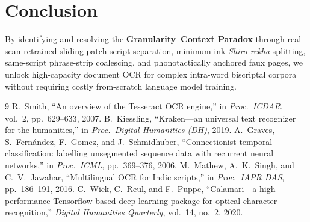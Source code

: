 \documentclass[10pt,twocolumn]{article}
\begin{document}
\section{Conclusion}

By identifying and resolving the \textbf{Granularity--Context Paradox} through real-scan-retrained sliding-patch script separation, minimum-ink \emph{Shiro-rekh\={a}} splitting, same-script phrase-strip coalescing, and phonotactically anchored faux pages, we unlock high-capacity document OCR for complex intra-word biscriptal corpora without requiring costly from-scratch language model training.

\begin{thebibliography}{9}
 R.~Smith, ``An overview of the Tesseract OCR engine,'' in \emph{Proc.\ ICDAR}, vol.~2, pp.~629--633, 2007.
 B.~Kiessling, ``Kraken---an universal text recognizer for the humanities,'' in \emph{Proc.\ Digital Humanities (DH)}, 2019.
 A.~Graves, S.~Fern\'{a}ndez, F.~Gomez, and J.~Schmidhuber, ``Connectionist temporal classification: labelling unsegmented sequence data with recurrent neural networks,'' in \emph{Proc.\ ICML}, pp.~369--376, 2006.
 M.~Mathew, A.~K.~Singh, and C.~V.~Jawahar, ``Multilingual OCR for Indic scripts,'' in \emph{Proc.\ IAPR DAS}, pp.~186--191, 2016.
 C.~Wick, C.~Reul, and F.~Puppe, ``Calamari---a high-performance Tensorflow-based deep learning package for optical character recognition,'' \emph{Digital Humanities Quarterly}, vol.~14, no.~2, 2020.
\end{thebibliography}
\end{document}
